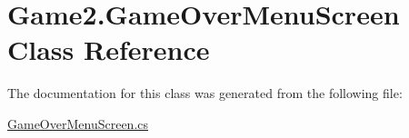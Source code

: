 \hypertarget{class_game2_1_1_game_over_menu_screen}{}\section{Game2.\+Game\+Over\+Menu\+Screen Class Reference}
\label{class_game2_1_1_game_over_menu_screen}


The documentation for this class was generated from the following file\+:\begin{DoxyCompactItemize}
\item 
\mbox{\hyperlink{_game_over_menu_screen_8cs}{Game\+Over\+Menu\+Screen.\+cs}}\end{DoxyCompactItemize}
